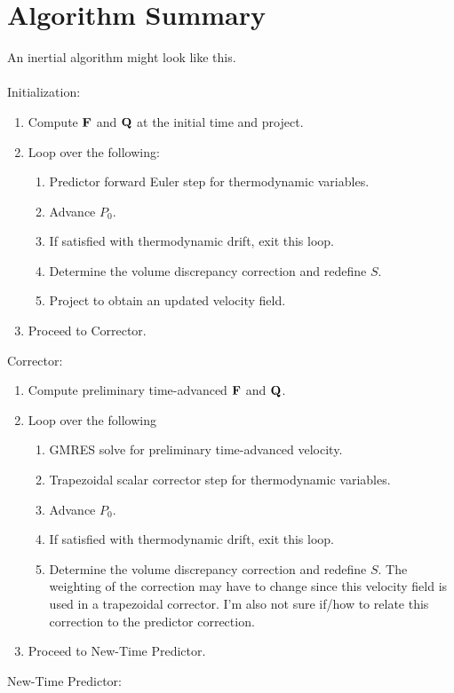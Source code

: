 \documentclass[final]{siamltex}
\def\Fb {{\bf F}}
\def\Qb {{\bf Q}}
\begin{document}
\section{Algorithm Summary}
An inertial algorithm might look like this.\\ \\
Initialization:\\
\begin{enumerate}
\item Compute $\Fb$ and $\Qb$ at the initial time and project.
\item Loop over the following:
\begin{enumerate}
\item Predictor forward Euler step for thermodynamic variables.
\item Advance $P_0$.
\item If satisfied with thermodynamic drift, exit this loop.
\item Determine the volume discrepancy correction and redefine $S$.
\item Project to obtain an updated velocity field.
\end{enumerate}
\item Proceed to Corrector.\\
\end{enumerate}
Corrector:\\
\begin{enumerate}
\item Compute preliminary time-advanced $\Fb$ and $\Qb$.
\item Loop over the following
\begin{enumerate}
\item GMRES solve for preliminary time-advanced velocity.
\item Trapezoidal scalar corrector step for thermodynamic variables.
\item Advance $P_0$.
\item If satisfied with thermodynamic drift, exit this loop.
\item Determine the volume discrepancy correction and redefine $S$.  The weighting of the
correction may have to change since this velocity field is used in a trapezoidal corrector.
I'm also not sure if/how to relate this correction to the predictor correction.
\end{enumerate}
\item Proceed to New-Time Predictor.\\
\end{enumerate}
New-Time Predictor:\\
\end{document}
